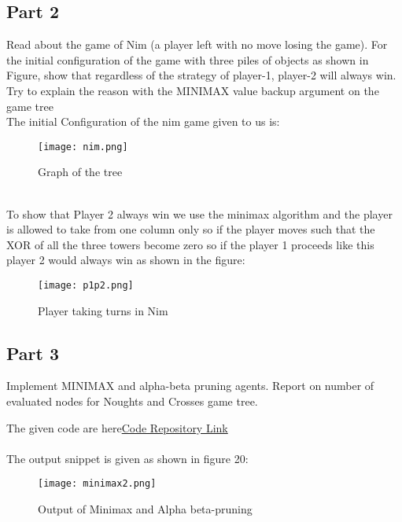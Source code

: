 \documentclass[conference]{IEEEtran}
\begin{document}
\subsection{Part 2}
Read about the game of Nim (a player left with no move losing the game). For the initial configuration of the game with three piles of objects as shown in Figure, show that regardless of the strategy of player-1, player-2 will always win. Try to explain the reason with the MINIMAX value backup argument on the game tree
\\
The initial Configuration of the nim game given to us is:
\begin{figure}[htbp]
\centerline{\texttt{[image: nim.png]}}
\caption{Graph of the tree}
\label{fig}
\end{figure}
\\
To show that Player 2 always win we use the minimax algorithm and the player is allowed to take from one column only so if the player moves such that the XOR of all the three towers become zero\cite{b9} so if the player 1 proceeds like this player 2 would always win as shown in the figure:
\\
\begin{figure}[htbp]
\centerline{\texttt{[image: p1p2.png]}}
\caption{Player taking turns in Nim}
\label{fig}
\end{figure}

\subsection{Part 3}
Implement MINIMAX and alpha-beta pruning agents. Report on number of evaluated nodes for Noughts and Crosses
game tree.\cite{b5}

The given code are here\href{https://github.com/darshh311/CS362_lab}{Code Repository Link}
\\
\\
The output snippet is given as shown in figure 20:
\begin{figure}[htbp]
\centerline{\texttt{[image: minimax2.png]}}
\caption{Output of Minimax and Alpha beta-pruning}
\label{fig}
\end{figure}
\end{document}
